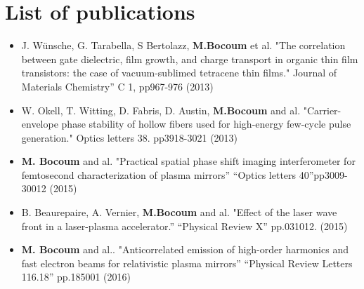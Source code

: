 \documentclass[11pt,a4paper,sans]{moderncv} %
\begin{document}
\section{List of publications}

\renewcommand{\listitemsymbol}{-~} %

\begin{itemize}
\item J. Wünsche, G. Tarabella, S Bertolazz, \textbf{M.Bocoum} et al. "The correlation between gate dielectric, film growth, and charge transport in organic thin film transistors: the case of vacuum-sublimed tetracene thin films." Journal of Materials Chemistry” C  1, pp967-976  (2013) 

\item W. Okell, T. Witting, D. Fabris, D. Austin, \textbf{M.Bocoum} and al. "Carrier-envelope phase stability of hollow fibers used for high-energy few-cycle pulse generation." Optics letters 38. pp3918-3021 (2013)

\item \textbf{M. Bocoum} and al. "Practical spatial phase shift imaging interferometer for femtosecond characterization of plasma mirrors” “Optics letters 40”pp3009-30012 (2015)

\item B. Beaurepaire, A. Vernier, \textbf{M.Bocoum} and al. "Effect of the laser wave front in a laser-plasma accelerator.” “Physical Review X” pp.031012. (2015)


\item \textbf{M. Bocoum}  and al.. "Anticorrelated emission of high-order harmonics and fast electron beams for relativistic plasma mirrors”  “Physical Review Letters 116.18” pp.185001  (2016)

\end{itemize}

\end{document}
